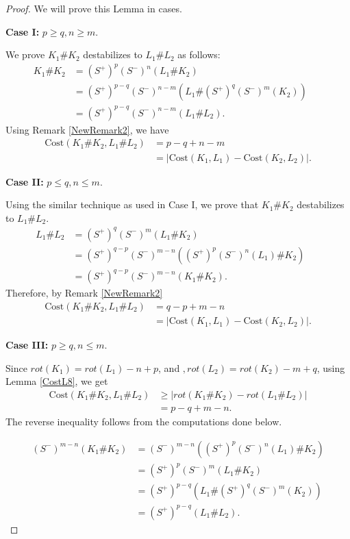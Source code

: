 \documentclass[10pt,a4paper]{amsart}
\newcommand{\Cost}{\text{Cost}}
\begin{document}
\begin{proof}
We will prove this Lemma in cases. 
    
    \noindent \textbf{Case I:} $p\geq q,n\geq m$.
    
  \noindent We prove $K_1\#K_2$ destabilizes to $L_1\#L_2$ as follows:
   \begin{align*}
       K_1\#K_2&=(S^+)^p(S^-)^n(L_1\#K_2)\\
       &=(S^+)^{p-q}(S^-)^{n-m}(L_1\#(S^+)^q(S^-)^{m}(K_2))\\
       &=(S^+)^{p-q}(S^-)^{n-m}(L_1\#L_2).&&
   \end{align*} 
   Using Remark \ref{NewRemark2}, we have
   \begin{align*}
       \Cost(K_1\#K_2,L_1\#L_2)&=p-q+n-m\\
       &=|\Cost(K_1,L_1)-\Cost(K_2,L_2)|.
   \end{align*}
   
 \noindent \textbf{Case II:} $p\leq q,n\leq m$.

   \noindent Using the similar technique as used in Case I, we prove that $K_1\#K_2$ destabilizes to $L_1\#L_2$.
   \begin{align*}
       L_1\#L_2&=(S^+)^q(S^-)^{m}(L_1\#K_2)\\
       &=(S^+)^{q-p}(S^-)^{m-n}((S^+)^p(S^-)^n(L_1)\#K_2)\\
       &=(S^+)^{q-p}(S^-)^{m-n}(K_1\#K_2).&&
   \end{align*} 
   Therefore, by Remark \ref{NewRemark2}
   \begin{align*}
       \Cost(K_1\#K_2,L_1\#L_2)&=q-p+m-n\\
       &=|\Cost(K_1,L_1)-\Cost(K_2,L_2)|.
   \end{align*}

   \noindent \textbf{Case III:} $p\geq q,n\leq m$.

\noindent Since $ rot(K_1)=rot(L_1)-n+p$, and $,rot(L_2)=rot(K_2)-m+q$, using Lemma \ref{CostL8}, we get
\begin{align*}
    \Cost(K_1\#K_2,L_1\#L_2)&\geq |rot(K_1\#K_2)-rot(L_1\#L_2)|\\
    &=p-q+m-n.
\end{align*}
The reverse inequality follows from the computations done below. 

   \begin{align*}
       (S^-)^{m-n}(K_1\#K_2)&=(S^-)^{m-n}((S^+)^p(S^-)^n(L_1)\#K_2)\\
       &=(S^+)^p(S^-)^{m}(L_1\#K_2)\\
       &=(S^+)^{p-q}(L_1\#(S^+)^q(S^-)^m(K_2))\\
       &=(S^+)^{p-q}(L_1\#L_2).
   \end{align*}


\end{proof}
\end{document}
